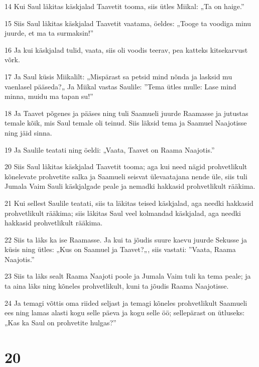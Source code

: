 \par 14 Kui Saul läkitas käskjalad Taavetit tooma, siis ütles Miikal: „Ta on haige.”
\par 15 Siis Saul läkitas käskjalad Taavetit vaatama, öeldes: „Tooge ta voodiga minu juurde, et ma ta surmaksin!”
\par 16 Ja kui käskjalad tulid, vaata, siis oli voodis teerav, pea katteks kitsekarvust võrk.
\par 17 Ja Saul küsis Miikalilt: „Mispärast sa petsid mind nõnda ja lasksid mu vaenlasel pääseda?„ Ja Miikal vastas Saulile: ”Tema ütles mulle: Lase mind minna, muidu ma tapan su!”
\par 18 Ja Taavet põgenes ja pääses ning tuli Saamueli juurde Raamasse ja jutustas temale kõik, mis Saul temale oli teinud. Siis läksid tema ja Saamuel Naajotisse ning jäid sinna.
\par 19 Ja Saulile teatati ning öeldi: „Vaata, Taavet on Raama Naajotis.”
\par 20 Siis Saul läkitas käskjalad Taavetit tooma; aga kui need nägid prohvetlikult kõnelevate prohvetite salka ja Saamueli seisvat ülevaatajana nende üle, siis tuli Jumala Vaim Sauli käskjalgade peale ja nemadki hakkasid prohvetlikult rääkima.
\par 21 Kui sellest Saulile teatati, siis ta läkitas teised käskjalad, aga needki hakkasid prohvetlikult rääkima; siis läkitas Saul veel kolmandad käskjalad, aga needki hakkasid prohvetlikult rääkima.
\par 22 Siis ta läks ka ise Raamasse. Ja kui ta jõudis suure kaevu juurde Sekusse ja küsis ning ütles: „Kus on Saamuel ja Taavet?„, siis vastati: ”Vaata, Raama Naajotis.”
\par 23 Siis ta läks sealt Raama Naajoti poole ja Jumala Vaim tuli ka tema peale; ja ta aina läks ning kõneles prohvetlikult, kuni ta jõudis Raama Naajotisse.
\par 24 Ja temagi võttis oma riided seljast ja temagi kõneles prohvetlikult Saamueli ees ning lamas alasti kogu selle päeva ja kogu selle öö; sellepärast on ütluseks: „Kas ka Saul on prohvetite hulgas?”

\chapter{20}

